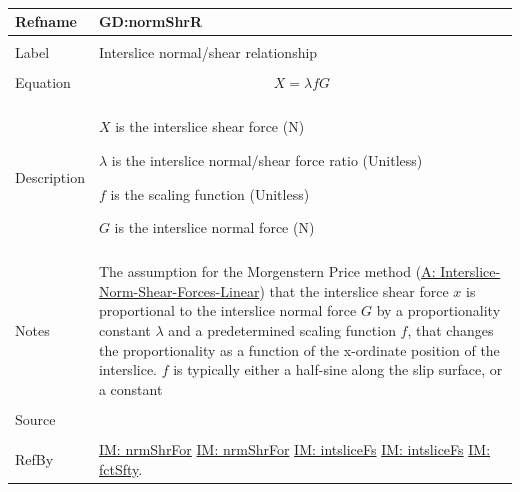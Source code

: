 \documentclass[12pt]{article}
\begin{document}
~\newline
 \noindent \begin{minipage}{\textwidth}
\begin{tabular}{p{} p{}}
\toprule \textbf{Refname} & \textbf{GD:normShrR}
\label{GD:normShrR}
\\ \midrule \\
Label & Interslice normal/shear relationship
        \\ \midrule \\
        Equation & \begin{dmath}
                   X=λ f G
                   \end{dmath}
                   \\ \midrule \\
                   Description & \begin{symbDescription}
                                 \item{$X$ is the interslice shear force (N)}
                                 \item{$λ$ is the interslice normal/shear force ratio (Unitless)}
                                 \item{$f$ is the scaling function (Unitless)}
                                 \item{$G$ is the interslice normal force (N)}
                                 \end{symbDescription}
                                 \\ \midrule \\
                                 Notes & The assumption for the Morgenstern Price method (\hyperref[A:Interslice-Norm-Shear-Forces-Linear]{A: Interslice-Norm-Shear-Forces-Linear}) that the interslice shear force $x$ is proportional to the interslice normal force $G$ by a proportionality constant $λ$ and a predetermined scaling function $f$, that changes the proportionality as a function of the x-ordinate position of the interslice. $f$ is typically either a half-sine along the slip surface, or a constant
                                         \\ \midrule \\
                                         Source & \cite{chen2005}
                                                  \\ \midrule \\
                                                  RefBy & \hyperref[IM:nrmShrFor]{IM: nrmShrFor} \hyperref[IM:nrmShrFor]{IM: nrmShrFor} \hyperref[IM:intsliceFs]{IM: intsliceFs} \hyperref[IM:intsliceFs]{IM: intsliceFs} \hyperref[IM:fctSfty]{IM: fctSfty}.
\\ \bottomrule \end{tabular}
\end{minipage}\\
\end{document}

